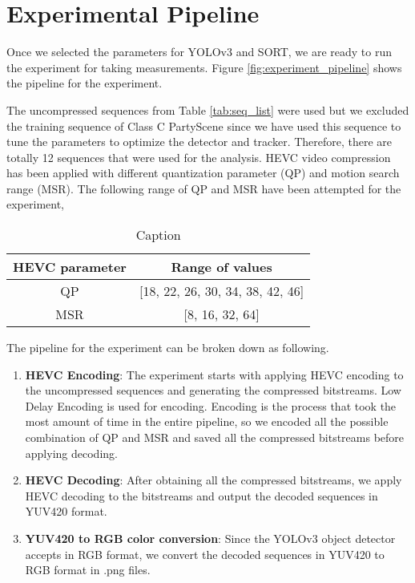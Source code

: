 \section{Experimental Pipeline}
\label{sec:methods/section_c}

Once we selected the parameters for YOLOv3 and SORT, we are ready to run the experiment for taking measurements. Figure \ref{fig:experiment_pipeline} shows the pipeline for the experiment.

The uncompressed sequences from Table \ref{tab:seq_list} were used but we excluded the training sequence of Class C PartyScene since we have used this sequence to tune the parameters to optimize the detector and tracker. Therefore, there are totally 12 sequences that were used for the analysis. HEVC video compression has been applied with different quantization parameter (QP) and motion search range (MSR). The following range of QP and MSR have been attempted for the experiment,


\begin{table}[]
    \centering
    \begin{tabular}{|c|c|}
        \hline
        HEVC parameter & Range of values \\
        \hline
        \hline
        QP & [18, 22, 26, 30, 34, 38, 42, 46] \\
        \hline
        MSR & [8, 16, 32, 64] \\
        \hline
    \end{tabular}
    \caption{Caption}
    \label{tab:qp_msr_range}
\end{table}

\noindent The pipeline for the experiment can be broken down as following.
\begin{enumerate}
    \item \textbf{HEVC Encoding}: The experiment starts with applying HEVC encoding to the uncompressed sequences and generating the compressed bitstreams. Low Delay Encoding is used for encoding. Encoding is the process that took the most amount of time in the entire pipeline, so we encoded all the possible combination of QP and MSR and saved all the compressed bitstreams before applying decoding.
    \item \textbf{HEVC Decoding}: After obtaining all the compressed bitstreams, we apply HEVC decoding to the bitstreams and output the decoded sequences in YUV420 format.
    \item \textbf{YUV420 to RGB color conversion}: Since the YOLOv3 object detector accepts in RGB format, we convert the decoded sequences in YUV420 to RGB format in .png files.
\end{enumerate}

